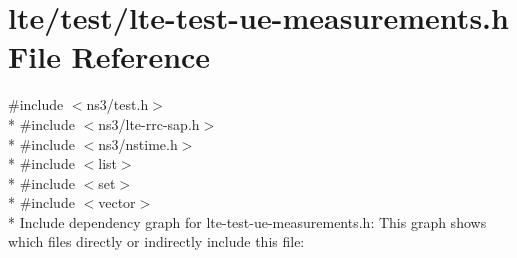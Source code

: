 \hypertarget{lte-test-ue-measurements_8h}{}\section{lte/test/lte-\/test-\/ue-\/measurements.h File Reference}
\label{lte-test-ue-measurements_8h}
{\ttfamily \#include $<$ns3/test.\+h$>$}\\*
{\ttfamily \#include $<$ns3/lte-\/rrc-\/sap.\+h$>$}\\*
{\ttfamily \#include $<$ns3/nstime.\+h$>$}\\*
{\ttfamily \#include $<$list$>$}\\*
{\ttfamily \#include $<$set$>$}\\*
{\ttfamily \#include $<$vector$>$}\\*
Include dependency graph for lte-\/test-\/ue-\/measurements.h\+:
This graph shows which files directly or indirectly include this file\+:

